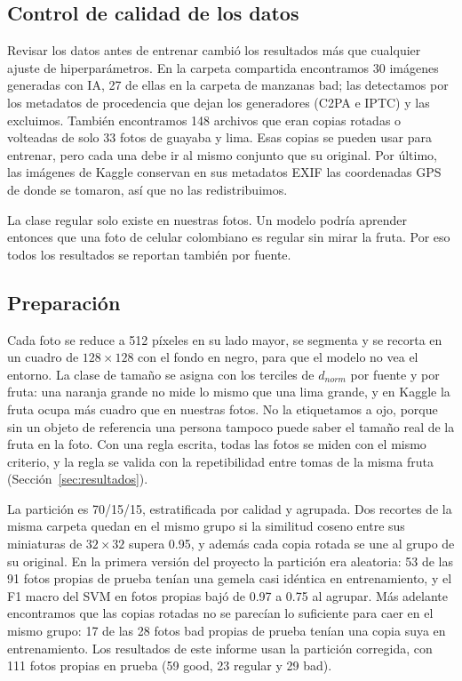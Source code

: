 \documentclass[conference]{IEEEtran}
\begin{document}
\subsection{Control de calidad de los datos}
Revisar los datos antes de entrenar cambió los resultados más que cualquier ajuste de hiperparámetros. En la carpeta compartida encontramos 30 imágenes generadas con IA, 27 de ellas en la carpeta de manzanas bad; las detectamos por los metadatos de procedencia que dejan los generadores (C2PA e IPTC) \cite{c2pa} y las excluimos. También encontramos 148 archivos que eran copias rotadas o volteadas de solo 33 fotos de guayaba y lima. Esas copias se pueden usar para entrenar, pero cada una debe ir al mismo conjunto que su original. Por último, las imágenes de Kaggle conservan en sus metadatos EXIF las coordenadas GPS de donde se tomaron, así que no las redistribuimos.

La clase regular solo existe en nuestras fotos. Un modelo podría aprender entonces que una foto de celular colombiano es regular sin mirar la fruta. Por eso todos los resultados se reportan también por fuente.

\subsection{Preparación}
Cada foto se reduce a 512 píxeles en su lado mayor, se segmenta y se recorta en un cuadro de $128\times128$ con el fondo en negro, para que el modelo no vea el entorno. La clase de tamaño se asigna con los terciles de $d_{norm}$ por fuente y por fruta: una naranja grande no mide lo mismo que una lima grande, y en Kaggle la fruta ocupa más cuadro que en nuestras fotos. No la etiquetamos a ojo, porque sin un objeto de referencia una persona tampoco puede saber el tamaño real de la fruta en la foto. Con una regla escrita, todas las fotos se miden con el mismo criterio, y la regla se valida con la repetibilidad entre tomas de la misma fruta (Sección~\ref{sec:resultados}).

La partición es 70/15/15, estratificada por calidad y agrupada. Dos recortes de la misma carpeta quedan en el mismo grupo si la similitud coseno entre sus miniaturas de $32\times32$ supera 0.95, y además cada copia rotada se une al grupo de su original. En la primera versión del proyecto la partición era aleatoria: 53 de las 91 fotos propias de prueba tenían una gemela casi idéntica en entrenamiento, y el F1 macro del SVM en fotos propias bajó de 0.97 a 0.75 al agrupar. Más adelante encontramos que las copias rotadas no se parecían lo suficiente para caer en el mismo grupo: 17 de las 28 fotos bad propias de prueba tenían una copia suya en entrenamiento. Los resultados de este informe usan la partición corregida, con 111 fotos propias en prueba (59 good, 23 regular y 29 bad).
\end{document}
